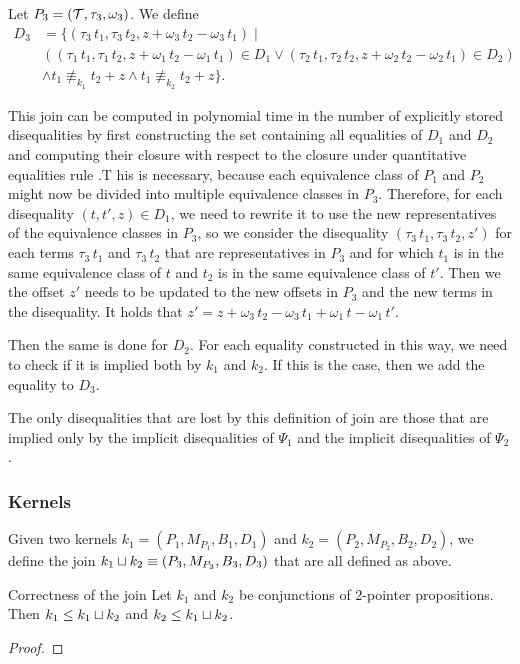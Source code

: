 Let $P_3 = (\mathcal{T}, \tau_3, \omega_3)$.
We define
\[
    \begin{array}{ll}
        D_3 & = \{(\tau_3\,t_1, \tau_3\,t_2, z + \omega_3\,t_2 - \omega_3\,t_1) \mid                                                                             \\
            & ((\tau_1\,t_1, \tau_1\,t_2, z + \omega_1\,t_2 - \omega_1\,t_1) \in D_1 \lor (\tau_2\,t_1, \tau_2\,t_2, z + \omega_2\,t_2 - \omega_2\,t_1) \in D_2) \\
            & \land t_1 \nequiv_{k_1} t_2 + z \land t_1 \nequiv_{k_2} t_2 + z\}.
    \end{array}
\]

This join can be computed in polynomial time in the number of explicitly stored disequalities by first constructing the set containing all equalities of $D_1$ and $D_2$
and computing their closure with respect to the closure under quantitative equalities rule .T
his is necessary, because each equivalence class of $P_1$ and $P_2$ might now be divided into multiple equivalence classes in $P_3$.
Therefore, for each disequality $(t, t', z) \in D_1$,
we need to rewrite it to use the new representatives of the equivalence classes in $P_3$,
so we consider the disequality $(\tau_3\,t_1, \tau_3\,t_2, z')$
for each terms $\tau_3\,t_1$ and $\tau_3\,t_2$ that are representatives in $P_3$ and for
which $t_1$ is in the same equivalence class of $t$ and $t_2$ is in the same equivalence class of $t'$.
Then we the offset $z'$ needs to be updated to the new offsets in $P_3$ and the new terms in the disequality.
It holds that $z' = z + \omega_3\,t_2 - \omega_3\,t_1 + \omega_1\,t - \omega_1\,t'$.

Then the same is done for $D_2$.
For each equality constructed in this way, we need to check if it is implied both by $k_1$ and $k_2$.
If this is the case, then we add the equality to $D_3$.

The only disequalities that are lost by this definition of join are those that are implied only by the implicit disequalities of $\Psi_1$ and the implicit disequalities of $\Psi_2$.

\subsubsection{Kernels}

Given two kernels $k_1 = (P_1, M_{P_1},B_1, D_1)$ and $k_2 = (P_2, M_{P_2},B_2, D_2)$, we define the join $k_1 \sqcup k_2 \equiv (P_3, M_{P_3},B_3, D_3)$ that are all defined as above.


\begin{proposition}{Correctness of the join}
    Let $k_1$ and $k_2$ be conjunctions of 2-pointer propositions.
    Then $k_1 \leq k_1 \sqcup k_2$ and $k_2 \leq k_1 \sqcup k_2$.
\end{proposition}

\begin{proof}
\end{proof}
